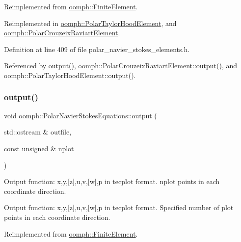 Reimplemented from \hyperlink{classoomph_1_1FiniteElement_a2ad98a3d2ef4999f1bef62c0ff13f2a7}{oomph\+::\+Finite\+Element}.



Reimplemented in \hyperlink{classoomph_1_1PolarTaylorHoodElement_ad6c70423cee82f9f2c7ff698f4f910ef}{oomph\+::\+Polar\+Taylor\+Hood\+Element}, and \hyperlink{classoomph_1_1PolarCrouzeixRaviartElement_ad93900ce702a77bb8d7710cf0f22ea8d}{oomph\+::\+Polar\+Crouzeix\+Raviart\+Element}.



Definition at line 409 of file polar\+\_\+navier\+\_\+stokes\+\_\+elements.\+h.



Referenced by output(), oomph\+::\+Polar\+Crouzeix\+Raviart\+Element\+::output(), and oomph\+::\+Polar\+Taylor\+Hood\+Element\+::output().

\mbox{\label{classoomph_1_1PolarNavierStokesEquations_a830bb7a0fc6532994fd1e173f7803d54}} 
\subsubsection{\texorpdfstring{output()}{output()}\hspace{0.1cm}{\footnotesize\ttfamily [2/4]}}
{\footnotesize\ttfamily void oomph\+::\+Polar\+Navier\+Stokes\+Equations\+::output (\begin{DoxyParamCaption}\item[{std\+::ostream \&}]{outfile,  }\item[{const unsigned \&}]{nplot }\end{DoxyParamCaption})\hspace{0.3cm}{\ttfamily [virtual]}}



Output function\+: x,y,\mbox{[}z\mbox{]},u,v,\mbox{[}w\mbox{]},p in tecplot format. nplot points in each coordinate direction. 

Output function\+: x,y,\mbox{[}z\mbox{]},u,v,\mbox{[}w\mbox{]},p in tecplot format. Specified number of plot points in each coordinate direction. 

Reimplemented from \hyperlink{classoomph_1_1FiniteElement_afa9d9b2670f999b43e6679c9dd28c457}{oomph\+::\+Finite\+Element}.



